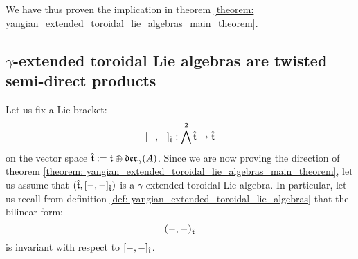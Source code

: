         We have thus proven the  implication in theorem \ref{theorem: yangian_extended_toroidal_lie_algebras_main_theorem}.

    \subsection{\texorpdfstring{$\gamma$}{}-extended toroidal Lie algebras are twisted semi-direct products} \label{subsection: yangian_extended_toroidal_lie_algebras_are_twisted_semi_direct_products}
        Let us fix a Lie bracket:
            $$[-, -]_{\hat{\mathfrak{t}}}: \bigwedge^2 \hat{\mathfrak{t}} \to \hat{\mathfrak{t}}$$
        on the vector space $\hat{\mathfrak{t}} := \mathfrak{t} \oplus \mathfrak{der}_{\gamma}(A)$. Since we are now proving the  direction of theorem \ref{theorem: yangian_extended_toroidal_lie_algebras_main_theorem}, let us assume that $(\hat{\mathfrak{t}}, [-, -]_{\hat{\mathfrak{t}}})$ is a $\gamma$-extended toroidal Lie algebra. In particular, let us recall from definition \ref{def: yangian_extended_toroidal_lie_algebras} that the bilinear form:
            $$(-, -)_{\hat{\mathfrak{t}}}$$
        is invariant with respect to $[-, -]_{\hat{\mathfrak{t}}}$.

